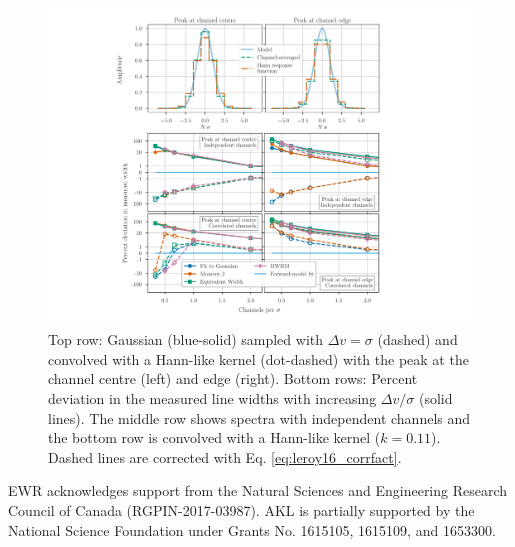 \documentclass{rnaastex}
\begin{document}
\begin{figure}
\includegraphics[width=\textwidth]{combined_figure}
\caption{\label{fig:width_recovery_comparison} Top row: Gaussian (blue-solid) sampled with $\Delta v = \sigma$ (dashed) and convolved with a Hann-like kernel (dot-dashed) with the peak at the channel centre (left) and edge (right). Bottom rows: Percent deviation in the measured line widths with increasing $\Delta v / \sigma$ (solid lines). The middle row shows spectra with independent channels and the bottom row is convolved with a Hann-like kernel ($k=0.11$). Dashed lines are corrected with Eq. \ref{eq:leroy16_corrfact}.}
\end{figure}

\acknowledgments

EWR acknowledges support from the Natural Sciences and Engineering Research Council of Canada (RGPIN-2017-03987). AKL is partially supported by the National Science Foundation under Grants No. 1615105, 1615109, and 1653300.

\end{document}
